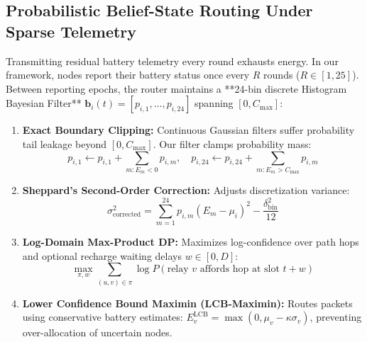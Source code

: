 \documentclass[journal]{IEEEtran}
\begin{document}
\subsection{Probabilistic Belief-State Routing Under Sparse Telemetry}
Transmitting residual battery telemetry every round exhausts energy. In our framework, nodes report their battery status once every $R$ rounds ($R \in [1, 25]$). Between reporting epochs, the router maintains a **24-bin discrete Histogram Bayesian Filter** $\mathbf{b}_i(t) = [p_{i, 1}, \dots, p_{i, 24}]$ spanning $[0, C_{\text{max}}]$:
\begin{enumerate}
    \item \textbf{Exact Boundary Clipping:} Continuous Gaussian filters suffer probability tail leakage beyond $[0, C_{\text{max}}]$. Our filter clamps probability mass:
    \begin{equation}
    p_{i, 1} \leftarrow p_{i, 1} + \sum_{m: E_m < 0} p_{i, m}, \quad p_{i, 24} \leftarrow p_{i, 24} + \sum_{m: E_m > C_{\text{max}}} p_{i, m}
    \end{equation}
    \item \textbf{Sheppard's Second-Order Correction:} Adjusts discretization variance:
    \begin{equation}
    \sigma_{\text{corrected}}^2 = \sum_{m=1}^{24} p_{i, m}(E_m - \mu_i)^2 - \frac{\delta_{\text{bin}}^2}{12}
    \end{equation}
    \item \textbf{Log-Domain Max-Product DP:} Maximizes log-confidence over path hops and optional recharge waiting delays $w \in [0, D]$:
    \begin{equation}
    \max_{\pi, w} \sum_{(u, v) \in \pi} \log P(\text{relay } v \text{ affords hop at slot } t + w)
    \end{equation}
    \item \textbf{Lower Confidence Bound Maximin (LCB-Maximin):} Routes packets using conservative battery estimates: $E_v^{\text{LCB}} = \max(0, \mu_v - \kappa \sigma_v)$, preventing over-allocation of uncertain nodes.
\end{enumerate}
\end{document}
